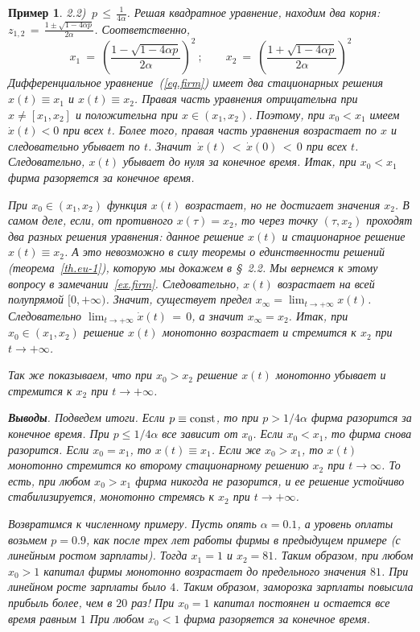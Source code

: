 \documentclass[12pt,a4paper]{article}
\newtheorem{ex}{Пример}
\begin{document}
\begin{ex}
{2.2)  $\, p \, \le  \, \frac{1}{4\alpha}$.  Решая квадратное уравнение, находим два корня: 
$z_{1, 2}\, = \, \frac{1 \pm \sqrt{1 - 4\alpha p}}{2\alpha}$. Соответственно, 
$$
x_1 \ = \ \left(\frac{1 - \sqrt{1 - 4\alpha p}}{2\alpha} \right)^2\ ; \qquad 
x_2 \ = \ \left(\frac{1 + \sqrt{1 - 4\alpha p}}{2\alpha} \right)^2
$$ 
Дифференциальное уравнение~(\ref{eq.firm}) имеет два стационарных решения $x(t)\equiv x_1$ и 
$x(t)\equiv x_2$. Правая часть уравнения 
отрицательна при $x \ne [x_1, x_2]$ и положительна при 
$x \in (x_1, x_2)$. Поэтому, при $x_0 < x_1$ имеем $\dot x(t) < 0$ при всех $t$. 
Более того, правая часть уравнения возрастает по $x$ и следовательно 
убывает по $t$. Значит $\, \dot x(t) \, < \, \dot x(0) \, < \, 0$
 при всех $t$. 
Следовательно, $x(t)$ убывает до нуля за конечное время. Итак, при $x_0 < x_1$ фирма разоряется за конечное время.  
\smallskip 

При $x_0 \in (x_1, x_2)$ функция $x(t)$ возрастает, но не достигает значения $x_2$. 
В самом деле, если, от противного $x(\tau) = x_2$, то через точку $(\tau, x_2)$ проходят два разных решения уравнения: данное решение $x(t)$ и стационарное решение $x(t)\equiv x_2$. 
А это невозможно в силу теоремы о единственности решений (теорема~\ref{th.eu-1}), которую мы докажем 
в \S \, 2.2. Мы вернемся к этому вопросу в замечании~\ref{ex.firm}.
 Следовательно, $x(t)$ возрастает на всей полупрямой $[0, +\infty)$. 
Значит, существует предел $x_{\infty} = \lim_{t \to + \infty} x(t)$. Следовательно $\lim_{t \to + \infty} 
\dot x(t) \, = \, 0$, а значит $x_{\infty} = x_2$. 
Итак, при $x_0 \in (x_1, x_2)$ решение $x(t)$ монотонно возрастает и стремится к $x_2$ при $t \to +\infty$. 
\smallskip 

Так же показываем, что при  $x_0 > x_2$ решение $x(t)$ монотонно убывает и стремится к $x_2$  при $t \to +\infty$. 
\smallskip 

\textbf{Выводы}. Подведем итоги. Если  $p \equiv \rm {\rm const}$, то при $p > 1/4\alpha$ фирма разорится за конечное время. 
При $p \le 1/4\alpha$ все зависит от $x_0$. Если $x_0 < x_1$, то фирма снова разорится. Если 
$x_0 = x_1$, то $x(t) \equiv x_1$. Если же $x_0 > x_1$, то $x(t)$ монотонно стремится ко второму стационарному решению $x_2$ при $t \to \infty$.  То есть, при любом $x_0 > x_1$ фирма никогда не разорится, и ее решение 
устойчиво стабилизируется, монотонно стремясь к $x_2$ при $t \to +\infty$.    
\smallskip 

Возвратимся к численному примеру. 
Пусть опять $\alpha = 0.1$, а уровень оплаты возьмем $p = 0.9$, как после трех   
лет работы фирмы в предыдущем примере (с линейным ростом зарплаты). 
Тогда $x_1 = 1$ и $x_2 = 81$.  Таким образом, 
при любом $x_0 > 1$ капитал фирмы монотонно возрастает до предельного значения $81$. 
При линейном росте зарплаты было $4$. 
Таким образом, заморозка зарплаты повысила прибыль более, чем в $20$ раз!
 При $x_0 = 1$ капитал постоянен и остается все время равным $1$ 
При любом $x_0 < 1$ фирма разоряется за конечное время. 
}
\end{ex}
\end{document}
